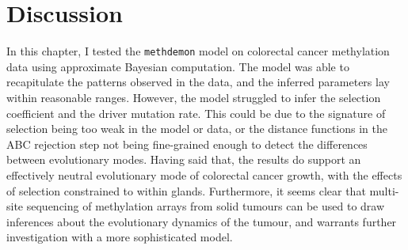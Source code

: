 \section{Discussion}

In this chapter, I tested the \texttt{methdemon} model on colorectal cancer
methylation data using approximate Bayesian computation. The model was able to
recapitulate the patterns observed in the data, and the inferred parameters lay
within reasonable ranges. However, the model struggled to infer the selection
coefficient and the driver mutation rate. This could be due to the signature of
selection being too weak in the model or data, or the distance functions in the
ABC rejection step not being fine-grained enough to detect the differences
between evolutionary modes. Having said that, the results do support an
effectively neutral evolutionary mode of colorectal cancer growth, with the
effects of selection constrained to within glands. Furthermore, it seems clear
that multi-site sequencing of methylation arrays from solid tumours can be used
to draw inferences about the evolutionary dynamics of the tumour, and warrants
further investigation with a more sophisticated model.

